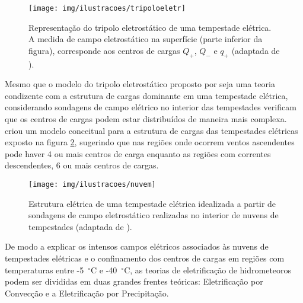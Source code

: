 \begin{figure}[ht]
\centering 
\texttt{[image: img/ilustracoes/tripoloeletr]}
\caption{Representação do tripolo eletrostático de uma tempestade elétrica. A medida de campo eletrostático na superfície (parte inferior da figura), corresponde aos centros de cargas $Q_{+}$, $Q_{-}$ e $q_{+}$ (adaptada de ).}
\label{fig:tripeletr}
\end{figure}

Mesmo que o modelo do tripolo eletrostático proposto por  seja uma teoria condizente com a estrutura de cargas dominante em uma tempestade elétrica, considerando sondagens de campo elétrico no interior das tempestades  verificam que os centros de cargas podem estar distribuídos de maneira mais complexa. 
 criou um modelo conceitual para a estrutura de cargas das tempestades elétricas exposto na figura \ref{fig:multipcentros}, sugerindo que nas regiões onde ocorrem ventos ascendentes pode haver 4 ou mais centros de carga enquanto as regiões com correntes descendentes, 6 ou mais centros de cargas.

\begin{figure}[ht]
\centering 
\texttt{[image: img/ilustracoes/nuvem]}
\caption{Estrutura elétrica de uma tempestade elétrica idealizada a partir de sondagens de campo eletrostático realizadas no interior de nuvens de tempestades (adaptada de ).}
\label{fig:multipcentros}
\end{figure}


De modo a explicar os intensos campos elétricos associados às nuvens de tempestades elétricas e o confinamento dos centros de cargas em regiões com temperaturas entre -5~$^{\circ}$C e -40~$^{\circ}$C, as teorias de eletrificação de hidrometeoros podem ser divididas em duas grandes frentes teóricas: Eletrificação por Convecção e a Eletrificação por Precipitação.



